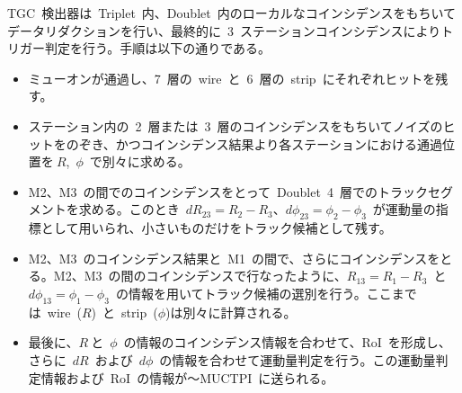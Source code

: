 TGC~検出器は~Triplet~内、Doublet~内のローカルなコインシデンスをもちいてデータリダクションを行い、最終的に~3~ステーションコインシデンスによりトリガー判定を行う。手順は以下の通りである。
\begin{itemize}
\item ミューオンが通過し、7~層の~wire~と~6~層の~strip~にそれぞれヒットを残す。
\item ステーション内の~2~層または~3~層のコインシデンスをもちいてノイズのヒットをのぞき、かつコインシデンス結果より各ステーションにおける通過位置を$~R$,~$\phi$~で別々に求める。
\item M2、M3~の間でのコインシデンスをとって~Doublet~4~層でのトラックセグメントを求める。このとき~$dR_{23}=R_2-R_3$、$d\phi_{23}=\phi_2-\phi_3$~が運動量の指標として用いられ、小さいものだけをトラック候補として残す。
\item M2、M3~のコインシデンス結果と~M1~の間で、さらにコインシデンスをとる。M2、M3~の間のコインシデンスで行なったように、$R_{13}=R_1-R_3$~と~$d\phi_{13}=\phi_1-\phi_3$~の情報を用いてトラック候補の選別を行う。ここまでは~wire~($R$)~と~strip~($\phi$)は別々に計算される。
\item 最後に、$R~$と~$\phi$~の情報のコインシデンス情報を合わせて、RoI~を形成し、さらに~$dR$~および~$d\phi$~の情報を合わせて運動量判定を行う。この運動量判定情報および~RoI~の情報が～MUCTPI~に送られる。
\end{itemize}

